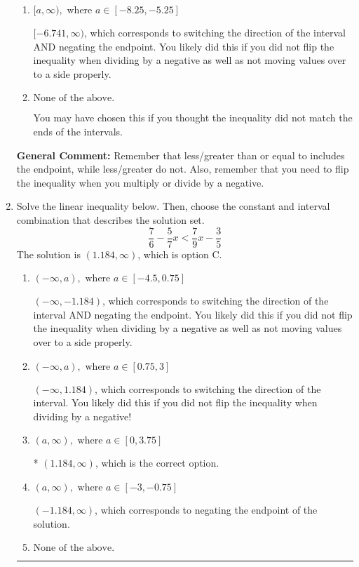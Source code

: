 \documentclass{extbook}[14pt]
\newcommand{\litem}[1]{\item #1

\rule{\textwidth}{0.4pt}}
\begin{document}
\begin{enumerate}
{\begin{enumerate}[label=\Alph*.]
 $[6.741, \infty)$, which corresponds to switching the direction of the interval. You likely did this if you did not flip the inequality when dividing by a negative!
\item \( [a, \infty), \text{ where } a \in [-8.25, -5.25] \)

 $[-6.741, \infty)$, which corresponds to switching the direction of the interval AND negating the endpoint. You likely did this if you did not flip the inequality when dividing by a negative as well as not moving values over to a side properly.
\item \( \text{None of the above}. \)

You may have chosen this if you thought the inequality did not match the ends of the intervals.
\end{enumerate}

\textbf{General Comment:} Remember that less/greater than or equal to includes the endpoint, while less/greater do not. Also, remember that you need to flip the inequality when you multiply or divide by a negative.
}
\litem{
Solve the linear inequality below. Then, choose the constant and interval combination that describes the solution set.
\[ \frac{7}{6} - \frac{5}{7} x < \frac{7}{9} x - \frac{3}{5} \]The solution is \( (1.184, \infty) \), which is option C.\begin{enumerate}[label=\Alph*.]
\item \( (-\infty, a), \text{ where } a \in [-4.5, 0.75] \)

 $(-\infty, -1.184)$, which corresponds to switching the direction of the interval AND negating the endpoint. You likely did this if you did not flip the inequality when dividing by a negative as well as not moving values over to a side properly.
\item \( (-\infty, a), \text{ where } a \in [0.75, 3] \)

 $(-\infty, 1.184)$, which corresponds to switching the direction of the interval. You likely did this if you did not flip the inequality when dividing by a negative!
\item \( (a, \infty), \text{ where } a \in [0, 3.75] \)

* $(1.184, \infty)$, which is the correct option.
\item \( (a, \infty), \text{ where } a \in [-3, -0.75] \)

 $(-1.184, \infty)$, which corresponds to negating the endpoint of the solution.
\item \( \text{None of the above}. \)


\end{enumerate}}
\end{enumerate}
\end{document}

